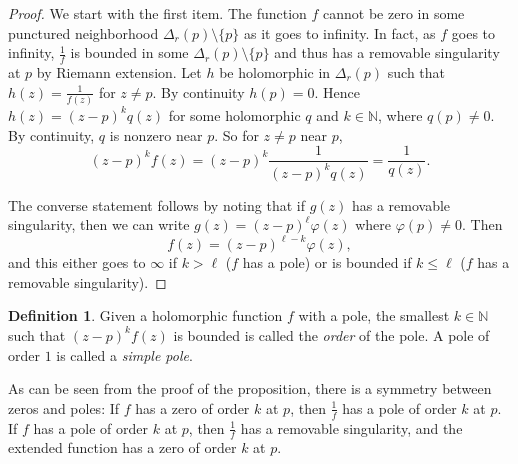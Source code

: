 \documentclass[12pt,openany]{book}
\newcommand{\N}{{\mathbb{N}}}
\newcommand{\myindex}[1]{#1\index{#1}}
\theoremstyle{plain}
\theoremstyle{remark}
\theoremstyle{definition}
\newtheorem{defn}[thm]{Definition}
\theoremstyle{exercise}
\theoremstyle{example}
\begin{document}
\begin{proof}
We start with the first item.
The function $f$ cannot be zero in some
punctured neighborhood $\Delta_r(p) \setminus \{p\}$ as it goes to infinity.
In fact, as $f$ goes to infinity,
$\frac{1}{f}$ is bounded in some $\Delta_r(p) \setminus \{p\}$ 
and thus has a removable singularity at $p$ by Riemann extension.
Let $h$ be holomorphic in $\Delta_r(p)$
such that $h(z) = \frac{1}{f(z)}$ for $z \not= p$.  By continuity $h(p) =
0$.  Hence $h(z) = {(z-p)}^k q(z)$ for some holomorphic $q$ and $k \in \N$,
where $q(p) \not= 0$.  By continuity, $q$ is nonzero near $p$.
So for $z \not= p$ near $p$,
\begin{equation*}
{(z-p)}^k f(z)
=
{(z-p)}^k \frac{1}{{(z-p)}^k q(z)}
=
\frac{1}{q(z)} .
\end{equation*}

The converse statement follows by noting that if $g(z)$ has a removable
singularity, then we can write $g(z) = {(z-p)}^\ell \varphi(z)$ where
$\varphi(p) \not= 0$.
Then
\begin{equation*}
f(z) = {(z-p)}^{\ell-k} \varphi(z) ,
\end{equation*}
and this either goes to $\infty$ if $k > \ell$ ($f$ has a pole) or is
bounded if $k \leq \ell$ ($f$ has a removable singularity).
\end{proof}

\begin{defn}
Given a holomorphic function $f$ with a pole, the smallest $k \in \N$
such that ${(z-p)}^k f(z)$ is bounded is called the
\emph{order} of the pole.
A pole of order $1$ is called a \emph{\myindex{simple pole}}.
\end{defn}

As can be seen from the proof of the proposition,
there is a symmetry between zeros and poles:
If $f$ has a zero of order $k$ at $p$, then $\frac{1}{f}$ has a pole of
order $k$ at $p$.
If $f$ has a pole of order $k$ at $p$, then $\frac{1}{f}$
has a removable singularity, and the extended function has a zero of order
$k$ at $p$.
\end{document}
